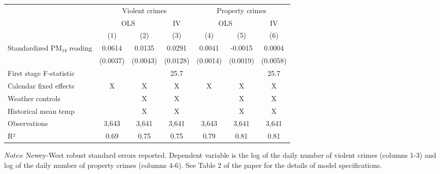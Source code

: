 \begingroup
\setlength{}
\setlength{}\fontsize{10.0pt}{12.0pt}\selectfont
\setlength{\LTpost}{0mm}
\begin{longtable}{@{\extracolsep{\fill}}lcccccc}
\toprule
 & \multicolumn{3}{c}{Violent crimes} & \multicolumn{3}{c}{Property crimes} \\ 
\cmidrule(lr){2-4} \cmidrule(lr){5-7}
 & \multicolumn{2}{c}{OLS} & IV & \multicolumn{2}{c}{OLS} & IV \\ 
\cmidrule(lr){2-3} \cmidrule(lr){4-4} \cmidrule(lr){5-6} \cmidrule(lr){7-7}
  & (1) & (2) & (3) & (4) & (5) & (6) \\ 
\midrule\addlinespace[2.5pt]
Standardized PM₁₀ reading & 0.0614 & 0.0135 & 0.0291 & 0.0041 & -0.0015 & 0.0004 \\ 
{} & {(0.0037)} & {(0.0043)} & {(0.0128)} & {(0.0014)} & {(0.0019)} & {(0.0058)} \\ 
First stage F-statistic &  &  & 25.7 &  &  & 25.7 \\ 
Calendar fixed effects & X & X & X & X & X & X \\ 
Weather controls &  & X & X &  & X & X \\ 
Historical mean temp &  & X & X &  & X & X \\ 
Observations & 3,643 & 3,641 & 3,641 & 3,643 & 3,641 & 3,641 \\ 
R² & 0.69 & 0.75 & 0.75 & 0.79 & 0.81 & 0.81 \\ 
\bottomrule
\end{longtable}
\begin{minipage}{\linewidth}
\emph{Notes}: Newey-West robust standard errors reported. Dependent variable
is the log of the daily number of violent crimes (columns 1-3) and log of the
daily number of property crimes (columns 4-6). See Table 2 of the paper for
the details of model specifications.\\
\end{minipage}
\endgroup

